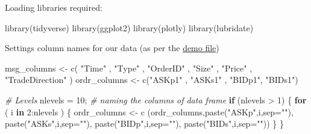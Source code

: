 \documentclass[
  oneside]{book}
\newenvironment{Shaded}{\begin{snugshade}}{\end{snugshade}}
\newcommand{\AttributeTok}[1]{\textcolor[rgb]{0.77,0.63,0.00}{#1}}
\newcommand{\CommentTok}[1]{\textcolor[rgb]{0.56,0.35,0.01}{\textit{#1}}}
\newcommand{\ControlFlowTok}[1]{\textcolor[rgb]{0.13,0.29,0.53}{\textbf{#1}}}
\newcommand{\DecValTok}[1]{\textcolor[rgb]{0.00,0.00,0.81}{#1}}
\newcommand{\FunctionTok}[1]{\textcolor[rgb]{0.00,0.00,0.00}{#1}}
\newcommand{\NormalTok}[1]{#1}
\newcommand{\OtherTok}[1]{\textcolor[rgb]{0.56,0.35,0.01}{#1}}
\newcommand{\SpecialCharTok}[1]{\textcolor[rgb]{0.00,0.00,0.00}{#1}}
\newcommand{\StringTok}[1]{\textcolor[rgb]{0.31,0.60,0.02}{#1}}
\begin{document}
Loading libraries required:

\begin{Shaded}
\begin{Highlighting}[]
\FunctionTok{library}\NormalTok{(tidyverse)}
\FunctionTok{library}\NormalTok{(ggplot2)}
\FunctionTok{library}\NormalTok{(plotly)}
\FunctionTok{library}\NormalTok{(lubridate)}
\end{Highlighting}
\end{Shaded}

Settings column names for our data (as per the \href{https://lobsterdata.com/info/help_codeHelp.php}{demo file})

\begin{Shaded}
\begin{Highlighting}[]
\NormalTok{msg\_columns }\OtherTok{\textless{}{-}} \FunctionTok{c}\NormalTok{( }\StringTok{"Time"}\NormalTok{ , }\StringTok{"Type"}\NormalTok{ , }\StringTok{"OrderID"}\NormalTok{ ,}
                  \StringTok{"Size"}\NormalTok{ , }\StringTok{"Price"}\NormalTok{ , }\StringTok{"TradeDirection"}\NormalTok{ )}
\NormalTok{ordr\_columns }\OtherTok{\textless{}{-}} \FunctionTok{c}\NormalTok{(}\StringTok{"ASKp1"}\NormalTok{ , }\StringTok{"ASKs1"}\NormalTok{ , }\StringTok{"BIDp1"}\NormalTok{,  }\StringTok{"BIDs1"}\NormalTok{)}

\CommentTok{\# Levels}
\NormalTok{nlevels }\OtherTok{=} \DecValTok{10}\NormalTok{;}
\CommentTok{\# naming the columns of data frame                                          }
\ControlFlowTok{if}\NormalTok{ (nlevels }\SpecialCharTok{\textgreater{}} \DecValTok{1}\NormalTok{)}
\NormalTok{\{}
    \ControlFlowTok{for}\NormalTok{ ( i }\ControlFlowTok{in} \DecValTok{2}\SpecialCharTok{:}\NormalTok{nlevels )}
\NormalTok{    \{ }
\NormalTok{        ordr\_columns }\OtherTok{\textless{}{-}} \FunctionTok{c}\NormalTok{ (ordr\_columns,}\FunctionTok{paste}\NormalTok{(}\StringTok{"ASKp"}\NormalTok{,i,}\AttributeTok{sep=}\StringTok{""}\NormalTok{),}
                           \FunctionTok{paste}\NormalTok{(}\StringTok{"ASKs"}\NormalTok{,i,}\AttributeTok{sep=}\StringTok{""}\NormalTok{),}
                           \FunctionTok{paste}\NormalTok{(}\StringTok{"BIDp"}\NormalTok{,i,}\AttributeTok{sep=}\StringTok{""}\NormalTok{),}
                           \FunctionTok{paste}\NormalTok{(}\StringTok{"BIDs"}\NormalTok{,i,}\AttributeTok{sep=}\StringTok{""}\NormalTok{)) }
\NormalTok{    \}}
\NormalTok{\}}
\end{Highlighting}
\end{Shaded}
\end{document}
